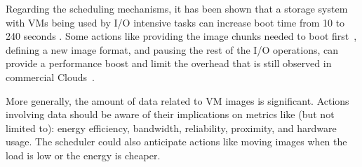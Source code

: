 Regarding the scheduling mechanisms, it has been shown that a storage system with VMs being used by I/O intensive tasks 
can increase boot time from 10 to 240 seconds \cite{tan:2008}. Some actions like providing the
image chunks needed to boot first~\cite{tang:2011}, defining a new
image format, and pausing the rest of the I/O operations, can provide a
performance boost and limit the overhead that is still observed in commercial
Clouds~\cite{mao:2012}. 

More generally, the amount of data related to VM images is significant.
Actions involving data  should be aware of their implications on metrics like
(but not limited to): energy efficiency, bandwidth, reliability, proximity, and
hardware usage. The scheduler could also anticipate actions like moving images when
the load is low or the energy is cheaper.


